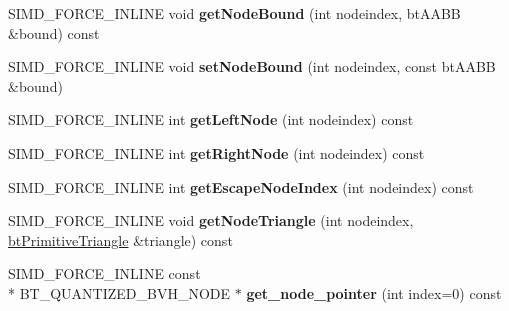 \begin{DoxyCompactItemize}
\item 
\hypertarget{classbt_g_impact_quantized_bvh_ab6eeee12286cff2bec91c754251ab990}{S\+I\+M\+D\+\_\+\+F\+O\+R\+C\+E\+\_\+\+I\+N\+L\+I\+N\+E void {\bfseries get\+Node\+Bound} (int nodeindex, bt\+A\+A\+B\+B \&bound) const }\label{classbt_g_impact_quantized_bvh_ab6eeee12286cff2bec91c754251ab990}

\item 
\hypertarget{classbt_g_impact_quantized_bvh_ad5ce839e5417a84899a177197dac9bca}{S\+I\+M\+D\+\_\+\+F\+O\+R\+C\+E\+\_\+\+I\+N\+L\+I\+N\+E void {\bfseries set\+Node\+Bound} (int nodeindex, const bt\+A\+A\+B\+B \&bound)}\label{classbt_g_impact_quantized_bvh_ad5ce839e5417a84899a177197dac9bca}

\item 
\hypertarget{classbt_g_impact_quantized_bvh_a776199eee36495997bb66c83d327b68e}{S\+I\+M\+D\+\_\+\+F\+O\+R\+C\+E\+\_\+\+I\+N\+L\+I\+N\+E int {\bfseries get\+Left\+Node} (int nodeindex) const }\label{classbt_g_impact_quantized_bvh_a776199eee36495997bb66c83d327b68e}

\item 
\hypertarget{classbt_g_impact_quantized_bvh_a7899262d2b08873551b1ba0122f5bcfa}{S\+I\+M\+D\+\_\+\+F\+O\+R\+C\+E\+\_\+\+I\+N\+L\+I\+N\+E int {\bfseries get\+Right\+Node} (int nodeindex) const }\label{classbt_g_impact_quantized_bvh_a7899262d2b08873551b1ba0122f5bcfa}

\item 
\hypertarget{classbt_g_impact_quantized_bvh_a72fa4709eaf6b15774125dc56fc69e33}{S\+I\+M\+D\+\_\+\+F\+O\+R\+C\+E\+\_\+\+I\+N\+L\+I\+N\+E int {\bfseries get\+Escape\+Node\+Index} (int nodeindex) const }\label{classbt_g_impact_quantized_bvh_a72fa4709eaf6b15774125dc56fc69e33}

\item 
\hypertarget{classbt_g_impact_quantized_bvh_a2dbf41531cb13827331e0cca9f271e54}{S\+I\+M\+D\+\_\+\+F\+O\+R\+C\+E\+\_\+\+I\+N\+L\+I\+N\+E void {\bfseries get\+Node\+Triangle} (int nodeindex, \hyperlink{classbt_primitive_triangle}{bt\+Primitive\+Triangle} \&triangle) const }\label{classbt_g_impact_quantized_bvh_a2dbf41531cb13827331e0cca9f271e54}

\item 
\hypertarget{classbt_g_impact_quantized_bvh_a59a67717a1dbbded99544f1b00733e7a}{S\+I\+M\+D\+\_\+\+F\+O\+R\+C\+E\+\_\+\+I\+N\+L\+I\+N\+E const \\*
B\+T\+\_\+\+Q\+U\+A\+N\+T\+I\+Z\+E\+D\+\_\+\+B\+V\+H\+\_\+\+N\+O\+D\+E $\ast$ {\bfseries get\+\_\+node\+\_\+pointer} (int index=0) const }\label{classbt_g_impact_quantized_bvh_a59a67717a1dbbded99544f1b00733e7a}


\end{DoxyCompactItemize}
